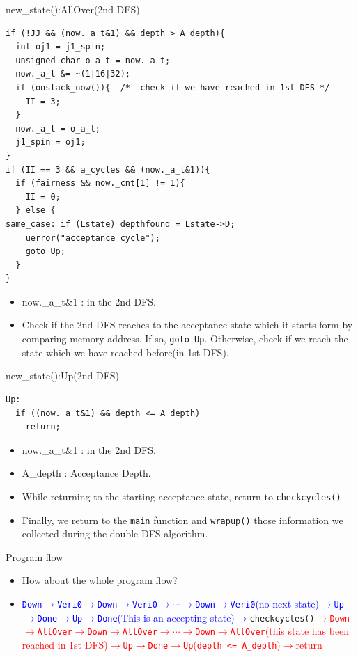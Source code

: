 \documentclass[12pt]{beamer}
\newcommand{\code}[1]{\texttt{#1}}
\begin{document}
\begin{frame}[fragile]{new\_state():AllOver(2nd DFS)}
\begin{lstlisting}[basicstyle=\footnotesize\ttfamily]
if (!JJ && (now._a_t&1) && depth > A_depth){
  int oj1 = j1_spin;
  unsigned char o_a_t = now._a_t;
  now._a_t &= ~(1|16|32);
  if (onstack_now()){  /*  check if we have reached in 1st DFS */
    II = 3;
  }
  now._a_t = o_a_t;
  j1_spin = oj1;
}
if (II == 3 && a_cycles && (now._a_t&1)){
  if (fairness && now._cnt[1] != 1){
    II = 0;
  } else {
same_case: if (Lstate) depthfound = Lstate->D;
    uerror("acceptance cycle");
    goto Up;
  }
}
\end{lstlisting}
\begin{itemize}
	\item now.\_a\_t\&1 : in the 2nd DFS.
	\item Check if the 2nd DFS reaches to the acceptance state which it starts form by comparing memory address. If so, \code{goto Up}. Otherwise, check if we reach the state which we have reached before(in 1st DFS).
\end{itemize}
\end{frame}

\begin{frame}[fragile]{new\_state():Up(2nd DFS)}
\begin{lstlisting}[basicstyle=\footnotesize\ttfamily]
Up:
  if ((now._a_t&1) && depth <= A_depth)
    return;
\end{lstlisting}
\begin{itemize}
	\item now.\_a\_t\&1 : in the 2nd DFS.
	\item A\_depth : Acceptance Depth.
	\item While returning to the starting acceptance state, return to \code{checkcycles()}
	\item Finally, we return to the \code{main} function and \code{wrapup()} those information we collected during the double DFS algorithm.
\end{itemize}
\end{frame}

\begin{frame}[fragile]{Program flow}
\begin{itemize}
	\item How about the whole program flow?
	\item 
	\textcolor{blue}{\code{Down}$\rightarrow$\code{Veri0}$\rightarrow$\code{Down}$\rightarrow$\code{Veri0}$\rightarrow\cdots\rightarrow$\code{Down}$\rightarrow$\code{Veri0}(no next state)$\rightarrow$\code{Up}$\rightarrow$\code{Done}$\rightarrow$\code{Up}$\rightarrow$\code{Done}(This is an accepting state)$\rightarrow$}\code{checkcycles()}\textcolor{red}{$\rightarrow$\code{Down}$\rightarrow$\code{AllOver}$\rightarrow$\code{Down}$\rightarrow$\code{AllOver}$\rightarrow\cdots\rightarrow$\code{Down}$\rightarrow$\code{AllOver}(this state has been reached in 1st DFS)$\rightarrow$\code{Up}$\rightarrow$\code{Done}$\rightarrow$\code{Up}(\code{depth <= A\_depth})$\rightarrow$return}
\end{itemize}
\end{frame}
\end{document}
